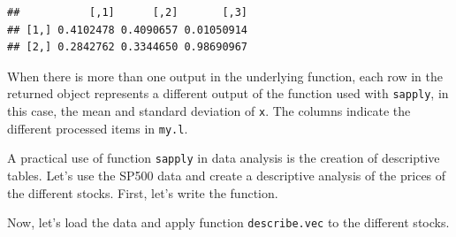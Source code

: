 \documentclass[11pt,]{book}
\newenvironment{Shaded}{\begin{snugshade}}{\end{snugshade}}
\newcommand{\KeywordTok}[1]{\textcolor[rgb]{0.27,0.27,0.27}{\textbf{#1}}}
\newcommand{\DataTypeTok}[1]{\textcolor[rgb]{0.27,0.27,0.27}{#1}}
\newcommand{\StringTok}[1]{\textcolor[rgb]{0.5,0.5,0.5}{#1}}
\newcommand{\CommentTok}[1]{\textcolor[rgb]{0.56,0.35,0.01}{\textit{#1}}}
\newcommand{\ControlFlowTok}[1]{\textcolor[rgb]{0.13,0.29,0.53}{\textbf{#1}}}
\newcommand{\OperatorTok}[1]{\textcolor[rgb]{0.81,0.36,0.00}{\textbf{#1}}}
\newcommand{\NormalTok}[1]{#1}
\begin{document}
\begin{verbatim}
##           [,1]      [,2]       [,3]
## [1,] 0.4102478 0.4090657 0.01050914
## [2,] 0.2842762 0.3344650 0.98690967
\end{verbatim}

When there is more than one output in the underlying function, each row
in the returned object represents a different output of the function
used with \texttt{sapply}, in this case, the mean and standard deviation
of \texttt{x}. The columns indicate the different processed items in
\texttt{my.l}.

A practical use of function \texttt{sapply} in data analysis is the
creation of descriptive tables. Let's use the SP500 data and create a
descriptive analysis of the prices of the different stocks. First, let's
write the function.

\begin{Shaded}
\end{Shaded}

Now, let's load the data and apply function \texttt{describe.vec} to the
different stocks. 
\end{document}
